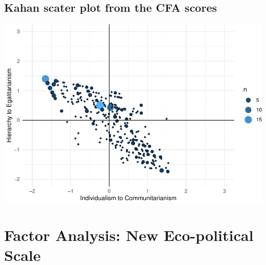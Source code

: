 \documentclass[
]{article}
\begin{document}
\hypertarget{kahan-scater-plot-from-the-cfa-scores}{%
\subsection{Kahan scater plot from the CFA
scores}\label{kahan-scater-plot-from-the-cfa-scores}}

\includegraphics{corstuff_files/figure-latex/unnamed-chunk-19-1.pdf}

\newpage

\hypertarget{factor-analysis-new-eco-political-scale}{%
\section{Factor Analysis: New Eco-political
Scale}\label{factor-analysis-new-eco-political-scale}}
\end{document}
